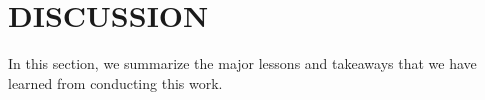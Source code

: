 \section{DISCUSSION}
In this section, we summarize the major lessons and takeaways that we have learned from conducting this work.
